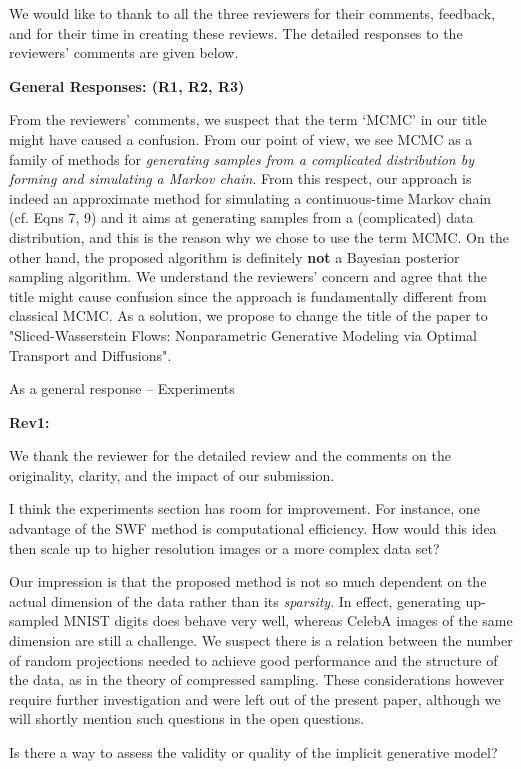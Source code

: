 \documentclass{article}
\newcommand{\rev}[1]{{\color{red} #1}}
\newcommand{\umut}[1]{{\color{blue} #1}}
\newcommand{\antoine}[1]{{\color{orange} #1}}
\begin{document}
We would like to thank to all the three reviewers for their comments, feedback, and for their time in creating these reviews. The detailed responses to the reviewers' comments are given below.

\textbf{General Responses: (R1, R2, R3)}

From the reviewers' comments, we suspect that the term `MCMC' in our title might have caused a confusion. From our point of view, we see MCMC as a family of methods for \emph{generating samples from a complicated distribution by forming and simulating a Markov chain}. From this respect, our approach is indeed an approximate method for simulating a continuous-time Markov chain (cf. Eqns 7, 9) and it aims at generating samples from a (complicated) data distribution, and this is the reason why we chose to use the term MCMC. On the other hand, the proposed algorithm is definitely \textbf{not} a Bayesian posterior sampling algorithm. We understand the reviewers' concern and agree that the title might cause confusion since the approach is fundamentally different from classical MCMC. As a solution, we propose to change the title of the paper to "Sliced-Wasserstein Flows: Nonparametric Generative Modeling via Optimal Transport and Diffusions".

\umut{As a general response -- Experiments}

\textbf{Rev1: }

We thank the reviewer for the detailed review and the comments on the originality, clarity, and the impact of our submission.

\rev{I think the experiments section has room for improvement. For instance, one advantage of the SWF method is computational efficiency. How would this idea then scale up to higher resolution images or a more complex data set?}

\antoine{Our impression is that the proposed method is not so much dependent on the actual dimension of the data rather than its \textit{sparsity}. In effect, generating up-sampled MNIST digits does behave very well, whereas CelebA images of the same dimension are still a challenge. We suspect there is a relation between the number of random projections needed to achieve good performance and the structure of the data, as in the theory of compressed sampling. These considerations however require further investigation and were left out of the present paper, although we will shortly mention such questions in the open questions.}

\rev{Is there a way to assess the validity or quality of the implicit generative model?}
\end{document}
